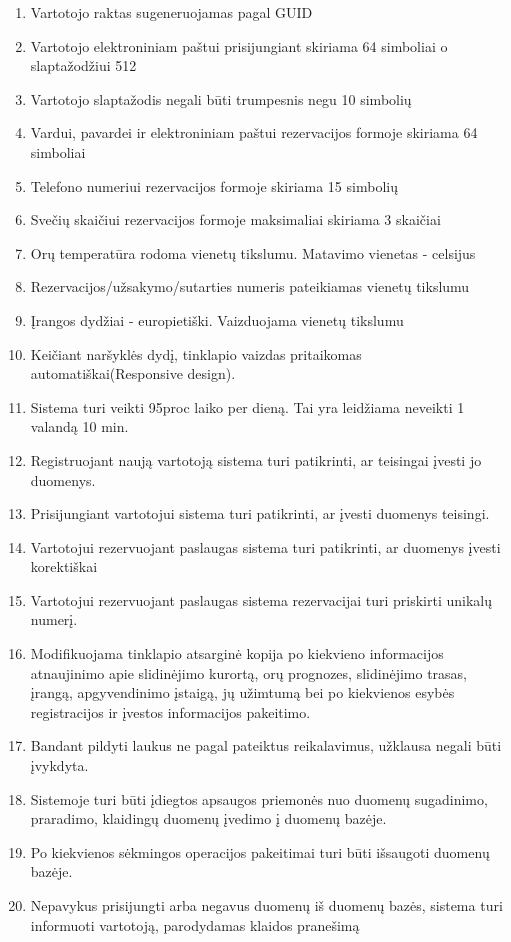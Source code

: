 \documentclass[oneside]{VUMIFPSkursinis}
\begin{document}
\begin{enumerate}
	\item Vartotojo raktas sugeneruojamas pagal GUID
	\item Vartotojo elektroniniam paštui prisijungiant skiriama 64 simboliai o slaptažodžiui 512
	\item Vartotojo slaptažodis negali būti trumpesnis negu 10 simbolių
	\item Vardui, pavardei ir elektroniniam paštui rezervacijos formoje skiriama 64 simboliai
	\item Telefono numeriui rezervacijos formoje skiriama 15 simbolių
	\item Svečių skaičiui rezervacijos formoje maksimaliai skiriama 3 skaičiai
	\item Orų temperatūra rodoma vienetų tikslumu. Matavimo vienetas - celsijus
	\item Rezervacijos/užsakymo/sutarties numeris pateikiamas vienetų tikslumu
	\item Įrangos dydžiai - europietiški. Vaizduojama vienetų tikslumu
	\item Keičiant naršyklės dydį, tinklapio vaizdas pritaikomas automatiškai(Responsive design).
	\item Sistema turi veikti 95proc laiko per dieną. Tai yra leidžiama neveikti 1 valandą 10 min.	
	\item Registruojant naują vartotoją sistema turi patikrinti, ar teisingai įvesti jo duomenys.
	\item Prisijungiant vartotojui sistema turi patikrinti, ar įvesti duomenys teisingi.
	\item Vartotojui rezervuojant paslaugas sistema turi patikrinti, ar duomenys įvesti korektiškai
	\item Vartotojui rezervuojant paslaugas sistema rezervacijai turi priskirti unikalų numerį.
	\item Modifikuojama tinklapio atsarginė kopija po kiekvieno informacijos atnaujinimo apie slidinėjimo kurortą, orų prognozes, slidinėjimo trasas, įrangą, apgyvendinimo įstaigą, jų užimtumą bei po kiekvienos esybės registracijos ir įvestos informacijos pakeitimo.
	\item Bandant pildyti laukus ne pagal pateiktus reikalavimus, užklausa negali būti įvykdyta.
	\item Sistemoje turi būti įdiegtos apsaugos priemonės nuo duomenų sugadinimo, praradimo, klaidingų duomenų įvedimo į duomenų bazėje.
	\item Po kiekvienos sėkmingos operacijos pakeitimai turi būti išsaugoti duomenų bazėje.
	\item Nepavykus prisijungti arba negavus duomenų iš duomenų bazės, sistema turi informuoti vartotoją, parodydamas klaidos pranešimą

\end{enumerate}
\end{document}
